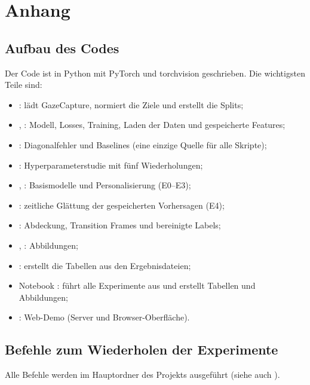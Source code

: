 \appendix
\chapter{Anhang}
\label{ch:anhang}

\section{Aufbau des Codes}
\label{sec:anhang_code}
Der Code ist in Python mit PyTorch und torchvision geschrieben. Die wichtigsten
Teile sind:
\begin{itemize}[nosep]
  \item {}: lädt GazeCapture, normiert die Ziele und erstellt die
        Splits;
  \item {}, : Modell, Losses, Training,
        Laden der Daten und gespeicherte Features;
  \item {}: Diagonalfehler und Baselines (eine einzige Quelle
        für alle Skripte);
  \item {}: Hyperparameterstudie mit fünf Wiederholungen;
  \item {}, : Basismodelle und
        Personalisierung (E0--E3);
  \item {}: zeitliche Glättung der gespeicherten
        Vorhersagen (E4);
  \item {}: Abdeckung, Transition Frames und bereinigte
        Labels;
  \item {}, : Abbildungen;
  \item {}: erstellt die Tabellen aus den Ergebnisdateien;
  \item Notebook : führt alle Experimente
        aus und erstellt Tabellen und Abbildungen;
  \item {}: Web-Demo (Server und Browser-Oberfläche).
\end{itemize}

\section{Befehle zum Wiederholen der Experimente}
\label{sec:anhang_befehle}
Alle Befehle werden im Hauptordner des Projekts ausgeführt (siehe auch
).

